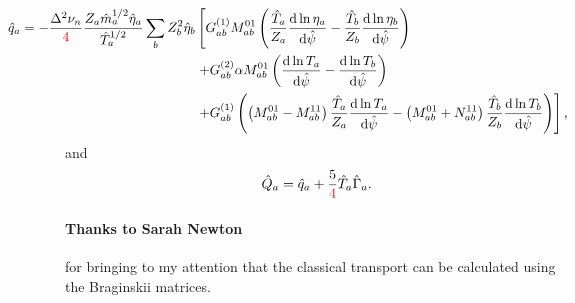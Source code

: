 \documentclass[12pt, a4paper]{article}
\renewcommand{\d}{\ensuremath{\mathrm{d}}}
\begin{document}
\begin{equation}
\begin{aligned}
  \hspace*{-10ex} \hat{q}_a =  -\frac{\Delta^2 \nu_n}{\textcolor{red}{4}} \frac{Z_a\hat{m}_a^{1/2} \hat{\eta}_a}{\hat{T}_a^{1/2}} \sum_b Z_b^2 \hat{\eta}_b &\left[
    G_{ab}^{(1)}  M_{ab}^{01}\left(\frac{\hat{T}_a}{Z_a}  \frac{\d \ln\eta_a}{\d \hat{\psi}} - \frac{\hat{T}_b}{Z_b}\frac{\d \ln\eta_b}{\d \hat{\psi}}\right) \right.\\
    &\left.+G_{ab}^{(2)} \alpha M_{ab}^{01} \left(\frac{\d \ln T_a}{\d \hat{\psi}}-\frac{\d \ln T_b}{\d \hat{\psi}}\right) \right.\\
    &\left.+ G_{ab}^{(1)} \left(\left(M_{ab}^{01} - M_{ab}^{11}\right)\frac{ \hat{T}_a}{Z_a} \frac{\d \ln T_a}{\d \hat{\psi}}
    - \left(M_{ab}^{01} + N_{ab}^{11}\right)\frac{\hat{T}_b}{Z_b}\frac{\d \ln T_b}{\d \hat{\psi}}\right) \right],
\end{aligned}
\end{equation}
and
\begin{equation}
\hat{Q}_a = \hat{q}_a + \frac{5}{\textcolor{red}{4}} \hat{T}_a \hat{\Gamma}_a. 
\end{equation}

\paragraph{Thanks to Sarah Newton} for bringing to my attention that the classical transport can be calculated using the Braginskii matrices. 
\end{document}
